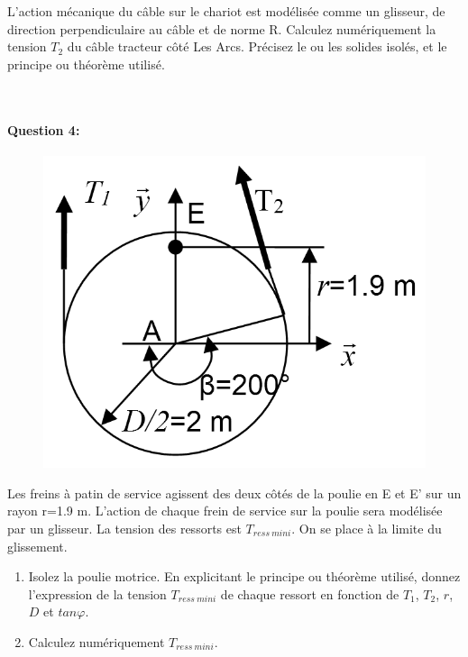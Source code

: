 L'action mécanique du câble sur le chariot est modélisée comme un glisseur, de direction perpendiculaire au câble et de norme R.
Calculez numériquement la tension $T_2$ du câble tracteur côté Les Arcs. Précisez le ou les solides isolés, et le principe ou théorème utilisé.

~\ \\

\paragraph{Question 4:}

\begin{figure}
	\vspace{-20pt}
	\centering \includegraphics[width=0.8\linewidth]{img/fig21}
	\label{fig21}
\end{figure}

Les freins à patin de service agissent des deux côtés de la poulie en E et E' sur un rayon r=1.9 m. L'action de chaque frein de service sur la poulie sera modélisée par un glisseur. La tension des ressorts est $T_{ress\ mini}$. On se place à la limite du glissement.
\begin{enumerate}
 \item Isolez la poulie motrice. En explicitant le principe ou théorème utilisé, donnez l'expression de la tension $T_{ress\ mini}$ de chaque ressort en fonction de $T_1$, $T_2$, $r$, $D$ et $tan \varphi$.
 \item Calculez numériquement $T_{ress\ mini}$.
\end{enumerate}

~\

